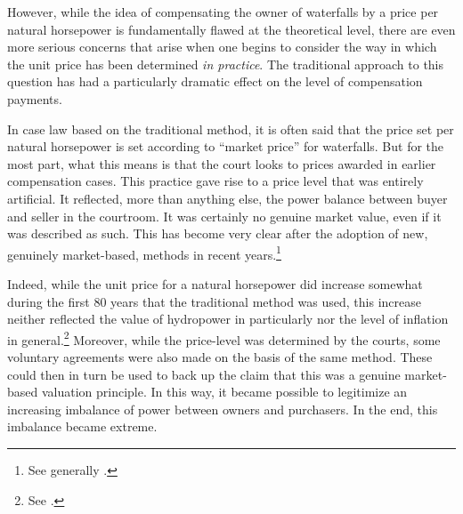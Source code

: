However, while the idea of compensating the owner of waterfalls by a price per natural horsepower is fundamentally flawed at the theoretical level, there are even more serious concerns that arise when one begins to consider the way in which the unit price has been determined {\it in practice}. The traditional approach to this question has had a particularly dramatic effect on the level of compensation payments. 

In case law based on the traditional method, it is often said that the price set per natural horsepower is set according to ``market price'' for waterfalls. But for the most part, what this means is that the court looks to prices awarded in earlier compensation cases. This practice gave rise to a price level that was entirely artificial. It reflected, more than anything else, the power balance between buyer and seller in the courtroom. It was certainly no genuine market value, even if it was described as such. This has become very clear after the adoption of new, genuinely market-based, methods in recent years.\footnote{See generally \cite{larsen08}.}

Indeed, while the unit price for a natural horsepower did increase somewhat during the first 80 years that the traditional method was used, this increase neither reflected the value of hydropower in particularly nor the level of inflation in general.\footnote{See \cite{sofienlund08}.} Moreover, while the price-level was determined by the courts, some voluntary agreements were also made on the basis of the same method. These could then in turn be used to back up the claim that this was a genuine market-based valuation principle. In this way, it became possible to legitimize an increasing imbalance of power between owners and purchasers. In the end, this imbalance became extreme.

